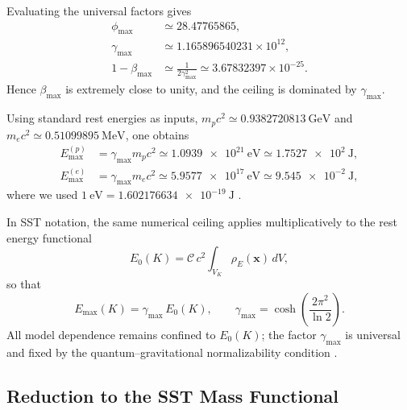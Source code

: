 \documentclass[11pt]{article}
\begin{document}
                Evaluating the universal factors gives
            \begin{align}
                \phi_{\max} &\simeq 28.47765865,\\
                \gamma_{\max} &\simeq 1.165896540231\times 10^{12},\\
                1-\beta_{\max} &\simeq \frac{1}{2\gamma_{\max}^2}
                \simeq 3.67832397\times 10^{-25}.
                \end{align}
                Hence $\beta_{\max}$ is extremely close to unity, and the ceiling is dominated by
                $\gamma_{\max}$.

                Using standard rest energies as inputs,
                $m_p c^2 \simeq \SI{0.9382720813}{\giga\electronvolt}$ and
                $m_e c^2 \simeq \SI{0.51099895}{\mega\electronvolt}$, one obtains
            \begin{align}
                E_{\max}^{(p)} &= \gamma_{\max} m_p c^2
                \simeq \SI{1.0939e21}{\electronvolt}
                \simeq \SI{1.7527e2}{\joule},\\
                E_{\max}^{(e)} &= \gamma_{\max} m_e c^2
                \simeq \SI{5.9577e17}{\electronvolt}
                \simeq \SI{9.545e-2}{\joule},
                \end{align}
                where we used $1~\mathrm{eV}=\SI{1.602176634e-19}{\joule}$ \cite{CODATA2018}.

                In SST notation, the same numerical ceiling applies multiplicatively to the
                rest energy functional
            \begin{equation}
                E_0(K)=\mathcal{C}\,c^2\int_{V_K}\rho_{\!E}(\mathbf{x})\,dV,
                \end{equation}
                so that
            \begin{equation}
                E_{\max}(K)=\gamma_{\max}\,E_0(K),
                \qquad
                \gamma_{\max}=\cosh\!\left(\frac{2\pi^2}{\ln 2}\right).
                \end{equation}
                All model dependence remains confined to $E_0(K)$; the factor $\gamma_{\max}$ is
                universal and fixed by the quantum--gravitational normalizability condition
                \cite{Makela2024QuantumGravity}.

        \subsection{Reduction to the SST Mass Functional}
\end{document}
